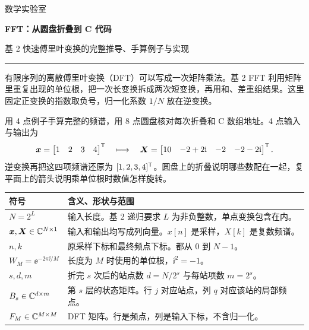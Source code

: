 \documentclass[UTF8,11pt,a4paper,fontset=fandol]{ctexart}
\newcommand{\W}{W}
\newcommand{\bt}{\boldsymbol}
\begin{document}
\hypertarget{fft-cover}{}
\vspace*{5mm}
{\songti\small\color{RoyalBlue}数学实验室}\par\vspace{6pt}
{\fontsize{31}{40}\selectfont\songti\bfseries\color{handoutink}FFT：从圆盘折叠到 C 代码}\par
\vspace{5pt}
{\large\color{handoutmuted}基 2 快速傅里叶变换的完整推导、手算例子与实现}\par
\vspace{7pt}
{\color{InkRule}\rule{\linewidth}{.6pt}}\par
有限序列的离散傅里叶变换（DFT）可以写成一次矩阵乘法。基 2 FFT 利用矩阵里重复出现的单位根，把一次长变换拆成两次短变换，再用和、差重组结果。这里固定正变换的指数取负号，归一化系数 $1/N$ 放在逆变换。

用 4 点例子手算完整的频谱，用 8 点圆盘核对每次折叠和 C 数组地址。4 点输入与输出为
\[
 \bt{x}=\begin{bmatrix}1&2&3&4\end{bmatrix}^{\rankff}
 \quad\longmapsto\quad
 \bt{X}=\begin{bmatrix}10&-2+2\ii&-2&-2-2\ii\end{bmatrix}^{\rankff}.
\]
逆变换再把这四项频谱还原为 $[1,2,3,4]^{\mathsf T}$。圆盘上的折叠说明哪些数配在一起，复平面上的箭头说明乘单位根时数值怎样旋转。

{\small\noindent
\begin{tabularx}{\linewidth}{@{}lY@{}}
\toprule
符号 & 含义、形状与范围 \\
\midrule
$N=2^L$ & 输入长度。基 2 递归要求 $L$ 为非负整数，单点变换包含在内。 \\
$\bt{x},\bt{X}\in\Cplx^{N\times1}$ & 输入和输出均写成列向量。$x[n]$ 是采样，$X[k]$ 是复数频谱。 \\
$n,k$ & 原采样下标和最终频点下标。都从 $0$ 到 $N-1$。 \\
$\W_M=\ee^{-2\pi\ii/M}$ & 长度为 $M$ 时使用的单位根，$\ii^2=-1$。 \\
$s,d,m$ & 折完 $s$ 次后的站点数 $d=N/2^s$ 与每站项数 $m=2^s$。 \\
$B_s\in\mathbb C^{d\times m}$ & 第 $s$ 层的状态矩阵。行 $j$ 对应站点，列 $q$ 对应该站的局部频点。 \\
$F_M\in\mathbb C^{M\times M}$ & DFT 矩阵。行是频点，列是输入下标，不含归一化。 \\
\bottomrule
\end{tabularx}\par}
\end{document}
